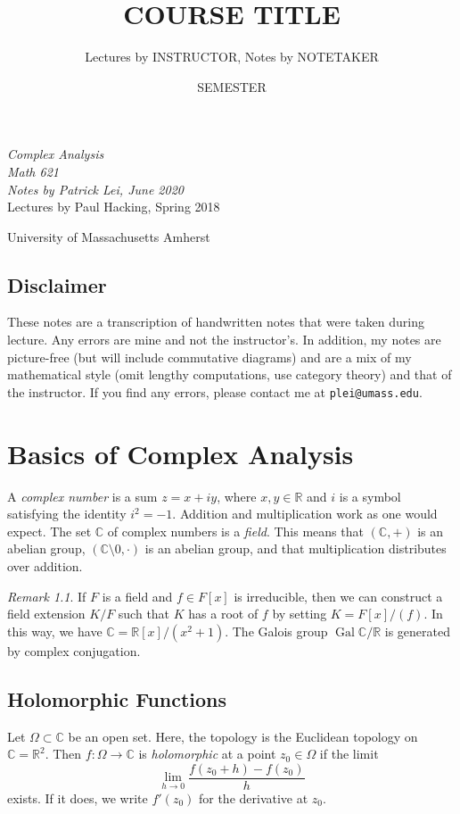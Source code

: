 \documentclass[leqno, openany]{memoir}
\title{COURSE TITLE}
\author{Lectures by INSTRUCTOR, Notes by NOTETAKER}
\date{SEMESTER}
\theoremstyle{definition}
\theoremstyle{remark}
\newtheorem{rmk}[thm]{Remark}
\theoremstyle{plain}
\theoremstyle{definition}
\theoremstyle{remark}
\newcommand{\R}{\mathbb{R}}
\renewcommand{\C}{\mathbb{C}}
\newcommand*{\titleSW}
    {\begingroup%
    \raggedleft
    \vspace*{\baselineskip}
    {\Huge\itshape Complex Analysis \\ Math 621}\\[\baselineskip]
    {\large\itshape Notes by Patrick Lei,
                    June 2020}\\[0.2\textheight]
    {\Large Lectures by Paul Hacking, Spring 2018}\par
    \vfill
    {\Large \sffamily University of Massachusetts Amherst}
    \vspace*{\baselineskip}
\endgroup}
\begin{document}
    
\begin{titlingpage}
\titleSW
\end{titlingpage}

\thispagestyle{empty}
\section*{Disclaimer}%
\label{sec:disclaimer}

These notes are a transcription of handwritten notes that were taken during lecture. 
Any errors are mine and not the instructor's. 
In addition, my notes are picture-free (but will include commutative diagrams) and are a mix of my mathematical style 
(omit lengthy computations, use category theory) and that of the instructor.
If you find any errors, please contact me at \texttt{plei@umass.edu}.
\newpage

\tableofcontents

\chapter{Basics of Complex Analysis}%
\label{cha:basics_of_complex_analysis}

A \textit{complex number} is a sum $z = x + iy$, where $x,y \in \R$ and $i$ is a symbol satisfying the identity $i^2 = -1$. Addition and multiplication work as one would expect. The set $\C$ of complex numbers is a \textit{field}. This means that $(\C,+)$ is an abelian group, $(\C \setminus \qty{0}, \cdot)$ is an abelian group, and that multiplication distributes over addition.

\begin{rmk}
    If $F$ is a field and $f \in F[x]$ is irreducible, then we can construct a field extension $K/F$ such that $K$ has a root of $f$ by setting $K = F[x]/(f)$. In this way, we have $\C = \R[x] / (x^2 + 1)$. The Galois group $\operatorname{Gal} \C/\R$ is generated by complex conjugation.
\end{rmk}

\section{Holomorphic Functions}%
\label{sec:holomorphic_functions}

Let $\Omega \subset \C$ be an open set. Here, the topology is the Euclidean topology on $\C = \R^2$. Then $f: \Omega \to \C$ is \textit{holomorphic} at a point $z_0 \in \Omega$ if the limit
\[ \lim_{h \to 0} \frac{f(z_0+h) - f(z_0)}{h} \]
exists. If it does, we write $f'(z_0)$ for the derivative at $z_0$.
\end{document}

